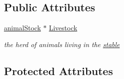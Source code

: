 \subsection*{Public Attributes}
\begin{DoxyCompactItemize}
\item 
\hyperlink{classanimal_stock}{animalStock} $\ast$ \hyperlink{classstable_ada5b39b9185fc598fda42e04cda311e3}{Livestock}
\begin{DoxyCompactList}\small\item\em the herd of animals living in the \hyperlink{classstable}{stable} \item\end{DoxyCompactList}\end{DoxyCompactItemize}
\subsection*{Protected Attributes}

